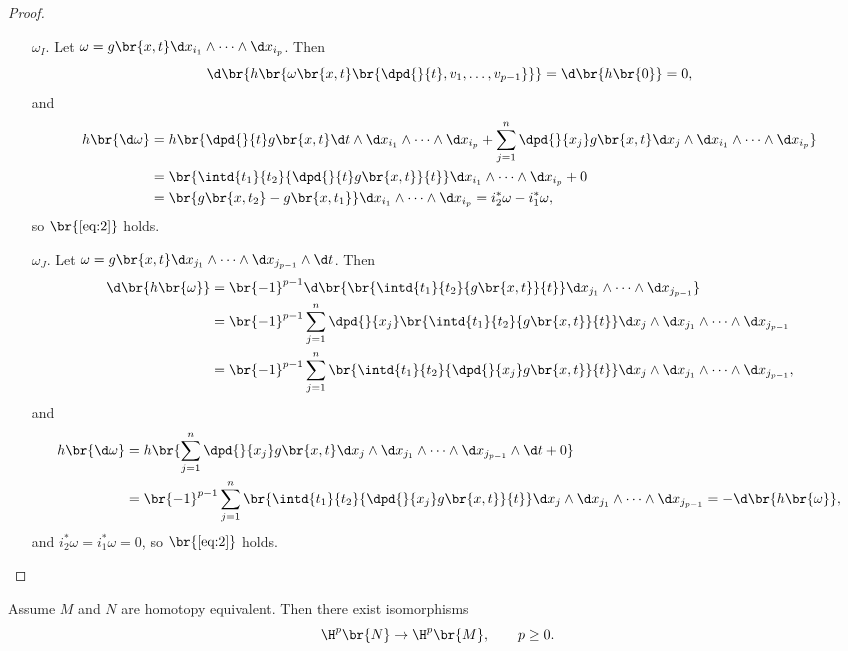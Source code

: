 \begin{proof}
\begin{enumerate}[leftmargin=0.5in, label=Step \arabic*.]
\pagebreak

\begin{itemize}
\item[$ \omega_I $.] Let $ \omega = g\br{x, t}\d x_{i_1} \wedge \dots \wedge \d x_{i_p} $. Then
$$ \d\br{h\br{\omega\br{x, t}\br{\dpd{}{t}, v_1, \dots, v_{p - 1}}}} = \d\br{h\br{0}} = 0, $$
and
\begin{align*}
h\br{\d\omega}
& = h\br{\dpd{}{t}g\br{x, t}\d t \wedge \d x_{i_1} \wedge \dots \wedge \d x_{i_p} + \sum_{j = 1}^n \dpd{}{x_j}g\br{x, t}\d x_j \wedge \d x_{i_1} \wedge \dots \wedge \d x_{i_p}} \\
& = \br{\intd{t_1}{t_2}{\dpd{}{t}g\br{x, t}}{t}}\d x_{i_1} \wedge \dots \wedge \d x_{i_p} + 0 \\
& = \br{g\br{x, t_2} - g\br{x, t_1}}\d x_{i_1} \wedge \dots \wedge \d x_{i_p}
= i_2^*\omega - i_1^*\omega,
\end{align*}
so $ \br{\ref{eq:2}} $ holds.
\item[$ \omega_J $.] Let $ \omega = g\br{x, t}\d x_{j_1} \wedge \dots \wedge \d x_{j_{p - 1}} \wedge \d t $. Then
\begin{align*}
\d\br{h\br{\omega}}
& = \br{-1}^{p - 1}\d\br{\br{\intd{t_1}{t_2}{g\br{x, t}}{t}}\d x_{j_1} \wedge \dots \wedge \d x_{j_{p - 1}}} \\
& = \br{-1}^{p - 1}\sum_{j = 1}^n \dpd{}{x_j}\br{\intd{t_1}{t_2}{g\br{x, t}}{t}}\d x_j \wedge \d x_{j_1} \wedge \dots \wedge \d x_{j_{p - 1}} \\
& = \br{-1}^{p - 1}\sum_{j = 1}^n \br{\intd{t_1}{t_2}{\dpd{}{x_j}g\br{x, t}}{t}}\d x_j \wedge \d x_{j_1} \wedge \dots \wedge \d x_{j_{p - 1}},
\end{align*}
and
\begin{align*}
h\br{\d\omega}
& = h\br{\sum_{j = 1}^n \dpd{}{x_j}g\br{x, t}\d x_j \wedge \d x_{j_1} \wedge \dots \wedge \d x_{j_{p - 1}} \wedge \d t + 0} \\
& = \br{-1}^{p - 1}\sum_{j = 1}^n \br{\intd{t_1}{t_2}{\dpd{}{x_j}g\br{x, t}}{t}}\d x_j \wedge \d x_{j_1} \wedge \dots \wedge \d x_{j_{p - 1}}
= -\d\br{h\br{\omega}},
\end{align*}
and $ i_2^*\omega = i_1^*\omega = 0 $, so $ \br{\ref{eq:2}} $ holds.
\end{itemize}
\end{enumerate}
\end{proof}

\begin{corollary}
\label{cor:2.14}
Assume $ M $ and $ N $ are homotopy equivalent. Then there exist isomorphisms
$$ \H^p\br{N} \to \H^p\br{M}, \qquad p \ge 0. $$
\end{corollary}


